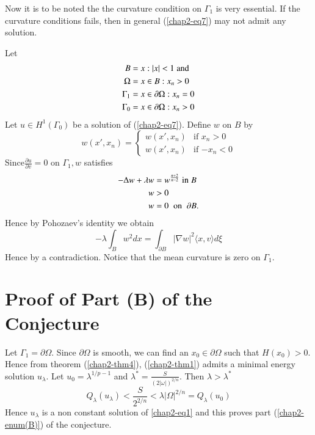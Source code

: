 Now it is to be noted the the curvature condition on $\Gamma_{1}$ is very essential. If the curvature conditions fails, then in general (\ref{chap2-eq7}) may not admit any solution.

\begin{example*}
Let  
\begin{align*} 
B &={x : |x| < 1}\; {\rm and}\\
\Omega &= {x \in B : x_{n} > 0}\\
\Gamma_{1} &= {x\in \partial \Omega : x_{n} = 0}\\
\Gamma_{0} &= {x\in \partial \Omega : x_{n} > 0}
\end{align*}
Let $u\in H^{1}(\Gamma_{0})$ be a solution of (\ref{chap2-eq7}). Define $w$ on $B$ by
\begin{equation*}
w(x', x_{n}) = 
\begin{cases}
w(x', x_{n}) & \text{if $x_{n} > 0$}\\
w(x', x_{n}) & \text{if $-x_{n}< 0$}
\end{cases}
\end{equation*}
Since\pageoriginale $\frac{\partial u}{\partial v} = 0$  on $ \Gamma_{1}, w$ satisfies 
\begin{align*}
-\Delta w + \lambda w &= w^{\frac{n+2}{n-2}}\; {\rm in}\; B\\
w &> 0\\
w &= 0 \;\;\text{on}\;\; \partial B.
\end{align*}
Hence by Pohozaev's identity we obtain
$$
-\lambda \int_{B} w^{2} dx = \int_{\partial B} |\nabla w|^{2} \langle x, v\rangle d\xi 
$$
Hence by a contradiction. Notice that the mean curvature is zero on $\Gamma_{1}$.
\end{example*}

\section*{Proof of Part (B) of the Conjecture}

Let $\Gamma_{1} = \partial\Omega$. Since $\partial\Omega$ is smooth, we can find an $x_{0} \in \partial\Omega$ such that $H(x_{0})> 0$. Hence from theorem (\ref{chap2-thm4}), (\ref{chap2-thm1}) admits a minimal energy solution $u_{\lambda}$. Let $u_{0} = \lambda^{1/p-1}$ and $\lambda^* = \frac{S}{(2|\omega|)^{2/n}}$. Then  $\lambda > \lambda^*$
$$
Q_{\lambda}(u_{\lambda}) < \dfrac{S}{2^{2/n}}< \lambda|\Omega|^{2/n} = Q_{\lambda}(u_{0})
$$
Hence $u_{\lambda}$ is a non constant solution of \eqref{chap2-eq1} and this proves part (\ref{chap2-enum(B)}) of the conjecture.

